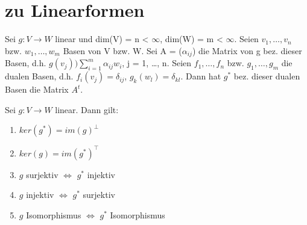 \section{zu Linearformen}
\begin{lemma}
Sei $g: V \to W$ linear und dim(V) = n < $\infty$, dim(W) = m < $\infty$. Seien $v_1, …, v_n$ bzw. $w_1, …, w_m$ Basen von V bzw. W. Sei A = ($\alpha_{ij}$) die Matrix von g bez. dieser Basen, d.h. $g(v_j) ) \sum\limits_{i=1}^m \alpha_{ij} w_i$, j = 1, …, n. Seien $f_1, …, f_n$ bzw. $g_1, …, g_m$ die dualen Basen, d.h. $f_i(v_j) = \delta_{ij}$, $g_k(w_l) = \delta_{kl}$. Dann hat $g^*$ bez. dieser dualen Basen die Matrix $A^t$.
\end{lemma}

\begin{proposition}
Sei $g: V \to W$ linear. Dann gilt:
\begin{enumerate}
\item $ker(g^*) = im(g)^\perp$
\item $ker(g) = im(g^*)^\top$
\item $g$ surjektiv $\Leftrightarrow$ $g^*$ injektiv
\item $g$ injektiv $\Leftrightarrow$ $g^*$ surjektiv
\item $g$ Isomorphismus $\Leftrightarrow$ $g^*$ Isomorphismus
\end{enumerate}
\end{proposition}

